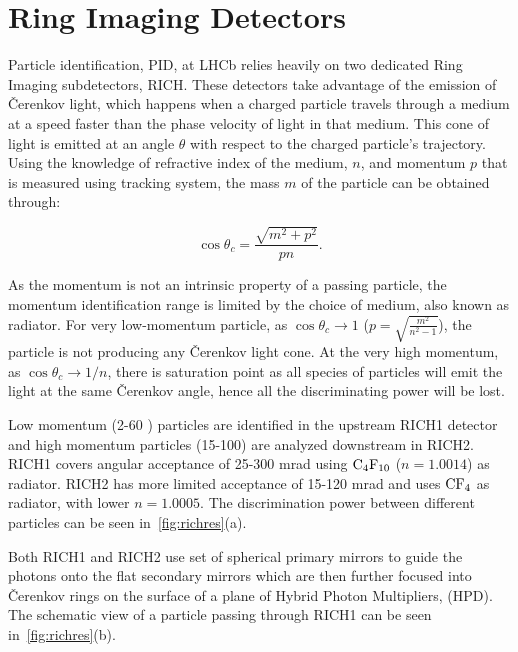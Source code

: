 \section{Ring Imaging Detectors }
\label{richsec}
Particle identification, \Gls{PID}, at \Gls{LHCb} relies heavily on two dedicated Ring Imaging subdetectors, \gls{RICH}. These detectors take advantage of the emission of \v{C}erenkov light, which happens when a charged particle travels through a medium at a speed faster than the phase velocity of light in that medium. This cone of light is emitted at an angle $\theta$ with respect to the charged particle's trajectory. Using the knowledge of refractive index of the medium, $n$, and momentum $p$ that is measured using tracking system, the mass $m$ of the particle can be obtained through:

\begin{equation}
	\cos\theta_{c} =  \frac{\sqrt{m^{2} + p^{2}}}{pn}.
\end{equation}

As the momentum is not an intrinsic property of a passing particle, the momentum identification range is limited by the choice of medium, also known as radiator. For very low-momentum particle, as $\cos\theta_{c} \rightarrow 1$ ($p=\sqrt{\frac{m^{2}}{n^{2}-1}}$), the particle is not producing any \v{C}erenkov light cone. At the very high momentum, as $\cos\theta_{c} \rightarrow 1/n$, there is saturation point as all species of particles will emit the light at the same \v{C}erenkov angle, hence all the discriminating power will be lost.

Low momentum (2-60 \gev) particles are identified in the upstream \gls{RICH1} detector and high momentum particles (15-100) \gev are analyzed downstream in \gls{RICH2}. \gls{RICH1} covers angular acceptance of 25-300 mrad using $\rm{C_{4}F_{10}}$ ($n = 1.0014$) as radiator. \gls{RICH2} has more limited acceptance of 15-120 mrad and uses $\rm{CF_{4}}$ as radiator, with lower $n=1.0005$. The discrimination power between different particles can be seen in~\autoref{fig:richres}(a). 


Both \gls{RICH1} and \gls{RICH2} use set of spherical primary mirrors to guide the photons onto the flat secondary mirrors which are then further focused into \v{C}erenkov rings on the surface of a plane of Hybrid Photon Multipliers, (\Gls{HPD}). The schematic view of a particle passing through \gls{RICH1} can be seen in~\autoref{fig:richres}(b). 


